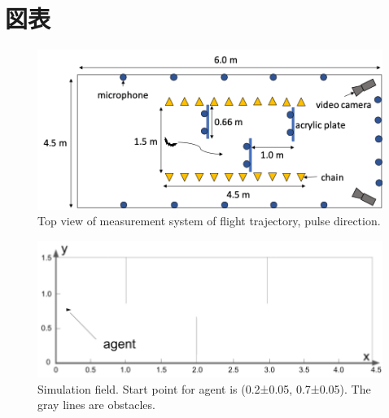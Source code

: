 \documentclass[../main]{subfiles}
\begin{document}
\newpage
\chapter*{図表}

\renewcommand{\figurename}{Fig. } %
\renewcommand{\tablename}{Table } %

\makeatletter
{}
\makeatother

\def\thefigure{\arabic{figure}}
\def\thetable{\arabic{table}}


\begin{figure}[H]
  \centering
  \includegraphics[width=15cm]{figures/top_view_measure.png}
  \caption{
    Top view of measurement system of flight trajectory,
    pulse direction.
  }
  \label{fig:top_view_measure}
\end{figure}

\newpage
{}
\begin{figure}[H]
  \centering
  \vfill
  \includegraphics[width=15cm]{figures/simulation_field.png}
  \caption{
    Simulation field.
    Start point for agent is (0.2±0.05, 0.7±0.05).
    The gray lines are obstacles.
  }\label{fig:simulation_field}
\end{figure}
\end{document}
